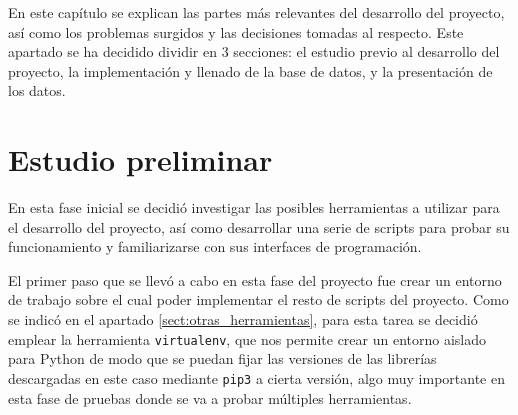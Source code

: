 

En este capítulo se explican las partes más relevantes del desarrollo del proyecto, así como los problemas surgidos y las decisiones tomadas al respecto. Este apartado se ha decidido dividir en 3 secciones: el estudio previo al desarrollo del proyecto, la implementación y llenado de la base de datos, y la presentación de los datos.

\section{Estudio preliminar}
\label{sect:estudio_preliminar}

En esta fase inicial se decidió investigar las posibles herramientas a utilizar para el desarrollo del proyecto, así como desarrollar una serie de scripts para probar su funcionamiento y familiarizarse con sus interfaces de programación.

El primer paso que se llevó a cabo en esta fase del proyecto fue crear un entorno de trabajo sobre el cual poder implementar el resto de scripts del proyecto. Como se indicó en el apartado \ref{sect:otras_herramientas}, para esta tarea se decidió emplear la herramienta \texttt{virtualenv}, que nos permite crear un entorno aislado para Python de modo que se puedan fijar las versiones de las librerías descargadas en este caso mediante \texttt{pip3} a cierta versión, algo muy importante en esta fase de pruebas donde se va a probar múltiples herramientas.

